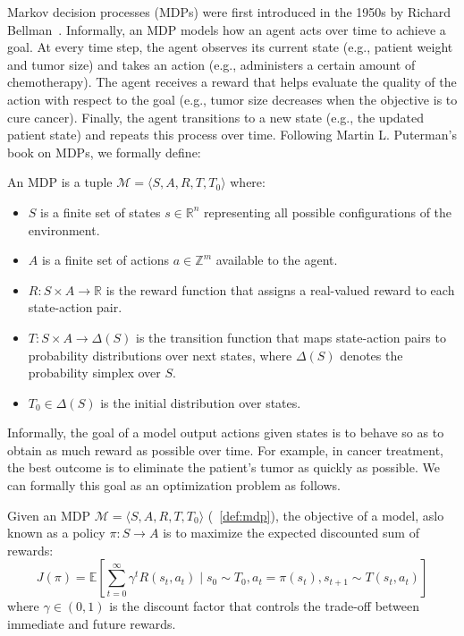 Markov decision processes (MDPs) were first introduced in the 1950s by Richard Bellman~\cite{Bellman}.
Informally, an MDP models how an agent acts over time to achieve a goal. 
At every time step, the agent observes its current state (e.g., patient weight and tumor size) and takes an action (e.g., administers a certain amount of chemotherapy).
The agent receives a reward that helps evaluate the quality of the action with respect to the goal (e.g., tumor size decreases when the objective is to cure cancer).
Finally, the agent transitions to a new state (e.g., the updated patient state) and repeats this process over time. 
Following Martin L. Puterman's book on MDPs\cite{puterman}, we formally define:
\begin{definition}\label{def:mdp} An MDP is a tuple $\mathcal{M} = \langle S, A, R, T, T_0 \rangle$ where:
\begin{itemize}
\item $S$ is a finite set of states $s \in \mathbb{R}^n$ representing all possible configurations of the environment.
\item $A$ is a finite set of actions $a \in \mathbb{Z}^m$ available to the agent.
\item $R: S \times A \rightarrow \mathbb{R}$ is the reward function that assigns a real-valued reward to each state-action pair.
\item $T: S \times A \rightarrow \Delta(S)$ is the transition function that maps state-action pairs to probability distributions over next states, where $\Delta(S)$ denotes the probability simplex over $S$.
\item $T_0 \in \Delta(S)$ is the initial distribution over states.
\end{itemize}
\end{definition}

Informally, the goal of a model output actions given states is to behave so as to obtain as much reward as possible over time.
For example, in cancer treatment, the best outcome is to eliminate the patient's tumor as quickly as possible.
We can formally this goal as an optimization problem as follows.

\begin{definition}\label{def:mdp-obj} Given an MDP $\mathcal{M}=\langle S, A, R, T, T_0 \rangle$ (~\ref{def:mdp}), the objective of a model, aslo known as a policy $\pi: S \rightarrow A$ is to maximize the expected discounted sum of rewards:
$$J(\pi) = \mathbb{E}\left[\sum_{t=0}^{\infty} \gamma^t R(s_t, a_t) \mid s_0 \sim T_0, a_t = \pi(s_t), s_{t+1} \sim T(s_t, a_t)\right]$$
where $\gamma \in (0,1)$ is the discount factor that controls the trade-off between immediate and future rewards.
\end{definition}

